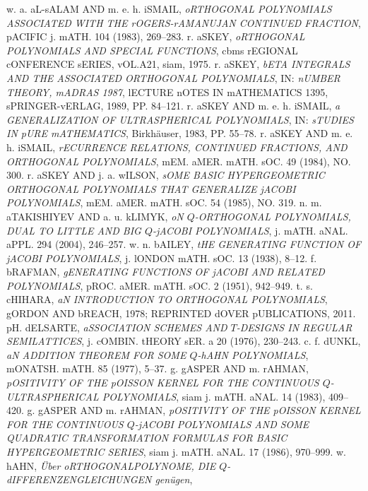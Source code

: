 \documentclass[twoside,11pt]{article}
\newcommand\mybibitem[1]{\bibitem[#1]{#1}\hypertarget{#1}{}}
\newcommand\mybibitemKLS[1]{\bibitem[#1]{#1}\hypertarget{KLS#1}{}}
\begin{document}
\begin{thebibliography}{999} 
\label{sec_ref2} 
% 
\mybibitemKLS{24} 
w. a. aL-sALAM AND m. e. h. iSMAIL, 
{\em oRTHOGONAL POLYNOMIALS ASSOCIATED WITH THE rOGERS-rAMANUJAN CONTINUED FRACTION}, 
pACIFIC j. mATH. 104 (1983), 269--283. 
% 
\mybibitemKLS{46} 
r. aSKEY, 
{\em oRTHOGONAL POLYNOMIALS AND SPECIAL FUNCTIONS}, 
cbms rEGIONAL cONFERENCE sERIES, vOL.A21, siam, 1975. 
% 
\mybibitemKLS{51} 
 r. aSKEY, 
{\em bETA INTEGRALS AND THE ASSOCIATED ORTHOGONAL POLYNOMIALS}, 
IN: {\em nUMBER THEORY, mADRAS 1987}, 
lECTURE nOTES IN mATHEMATICS 1395, sPRINGER-vERLAG, 1989,  PP. 84--121. 
% 
\mybibitemKLS{63} 
r. aSKEY AND m. e. h. iSMAIL, 
{\em a GENERALIZATION OF ULTRASPHERICAL POLYNOMIALS}, 
IN: {\em sTUDIES IN pURE mATHEMATICS}, 
Birkh\"auser, 1983, PP. 55--78. 
% 
\mybibitemKLS{64} 
r. aSKEY AND m. e. h. iSMAIL, 
{\em rECURRENCE RELATIONS, CONTINUED FRACTIONS, AND ORTHOGONAL POLYNOMIALS}, 
mEM. aMER. mATH. sOC. 49 (1984), NO. 300. 
% 
\mybibitemKLS{72} 
r. aSKEY AND j. a. wILSON, 
{\em sOME BASIC HYPERGEOMETRIC ORTHOGONAL POLYNOMIALS THAT GENERALIZE jACOBI POLYNOMIALS}, 
mEM. aMER. mATH. sOC. 54 (1985), NO. 319. 
% 
\mybibitemKLS{79} 
n. m. aTAKISHIYEV AND a. u. kLIMYK, 
{\em oN $Q$-ORTHOGONAL POLYNOMIALS, DUAL TO LITTLE AND BIG 
$Q$-jACOBI POLYNOMIALS}, 
j. mATH. aNAL. aPPL. 294 (2004), 246--257. 
% 
\mybibitemKLS{91} 
w. n. bAILEY, 
{\em tHE GENERATING FUNCTION OF jACOBI POLYNOMIALS}, 
j. lONDON mATH. sOC. 13 (1938), 8--12. 
% 
\mybibitemKLS{109} 
f. bRAFMAN, 
{\em gENERATING FUNCTIONS OF jACOBI AND RELATED POLYNOMIALS}, 
pROC. aMER. mATH. sOC. 2 (1951), 942--949. 
% 
\mybibitemKLS{146} 
t. s. cHIHARA, 
{\em aN INTRODUCTION TO ORTHOGONAL POLYNOMIALS}, gORDON AND bREACH, 1978; 
REPRINTED dOVER pUBLICATIONS, 2011. 
% 
\mybibitemKLS{161} 
pH. dELSARTE, {\em aSSOCIATION SCHEMES AND $T$-DESIGNS IN REGULAR 
SEMILATTICES}, j. cOMBIN. tHEORY sER. a 20 (1976), 230--243. 
% 
\mybibitemKLS{186} 
c. f. dUNKL, 
{\em aN ADDITION THEOREM FOR SOME $Q$-hAHN POLYNOMIALS}, 
mONATSH. mATH. 85 (1977), 5--37. 
% 
\mybibitemKLS{234} 
g. gASPER AND m. rAHMAN, 
{\em pOSITIVITY OF THE pOISSON KERNEL FOR THE CONTINUOUS 
$Q$-ULTRASPHERICAL POLYNOMIALS}, 
siam j. mATH. aNAL. 14 (1983), 409--420. 
% 
\mybibitem{236} 
 g. gASPER AND m. rAHMAN, 
{\em pOSITIVITY OF THE pOISSON KERNEL FOR THE CONTINUOUS $Q$-jACOBI 
POLYNOMIALS AND SOME QUADRATIC TRANSFORMATION FORMULAS FOR BASIC 
HYPERGEOMETRIC SERIES}, 
siam j. mATH. aNAL. 17 (1986), 970--999. 
% 
\mybibitemKLS{261} 
w. hAHN, 
{\em \"Uber oRTHOGONALPOLYNOME, DIE $Q$-dIFFERENZENGLEICHUNGEN gen\"ugen}, 

\end{thebibliography}
\end{document}
